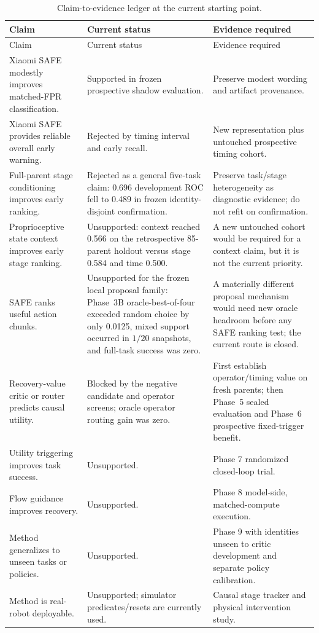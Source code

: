 \begin{longtable}{P{0.30\textwidth}P{0.23\textwidth}P{0.39\textwidth}}
\caption{Claim-to-evidence ledger at the current starting point.}\label{tab:claim-ledger}\\
\toprule
Claim & Current status & Evidence required \\
\midrule
\endfirsthead
\toprule
Claim & Current status & Evidence required \\
\midrule
\endhead
Xiaomi SAFE modestly improves matched-FPR classification. & Supported in frozen prospective shadow evaluation. & Preserve modest wording and artifact provenance. \\
Xiaomi SAFE provides reliable overall early warning. & Rejected by timing interval and early recall. & New representation plus untouched prospective timing cohort. \\
Full-parent stage conditioning improves early ranking. & Rejected as a general five-task claim: 0.696 development ROC fell to 0.489 in frozen identity-disjoint confirmation. & Preserve task/stage heterogeneity as diagnostic evidence; do not refit on confirmation. \\
Proprioceptive state context improves early stage ranking. & Unsupported: context reached 0.566 on the retrospective 85-parent holdout versus stage 0.584 and time 0.500. & A new untouched cohort would be required for a context claim, but it is not the current priority. \\
SAFE ranks useful action chunks. & Unsupported for the frozen local proposal family: Phase~3B oracle-best-of-four exceeded random choice by only 0.0125, mixed support occurred in $1/20$ snapshots, and full-task success was zero. & A materially different proposal mechanism would need new oracle headroom before any SAFE ranking test; the current route is closed. \\
Recovery-value critic or router predicts causal utility. & Blocked by the negative candidate and operator screens; oracle operator routing gain was zero. & First establish operator/timing value on fresh parents; then Phase~5 sealed evaluation and Phase~6 prospective fixed-trigger benefit. \\
Utility triggering improves task success. & Unsupported. & Phase 7 randomized closed-loop trial. \\
Flow guidance improves recovery. & Unsupported. & Phase 8 model-side, matched-compute execution. \\
Method generalizes to unseen tasks or policies. & Unsupported. & Phase 9 with identities unseen to critic development and separate policy calibration. \\
Method is real-robot deployable. & Unsupported; simulator predicates/resets are currently used. & Causal stage tracker and physical intervention study. \\
\bottomrule
\end{longtable}
